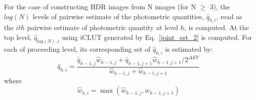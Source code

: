 For the case of constructing HDR images from N images (for N $\ge$ 3), the $log(N)$ levels of 
pairwise estimate of the photometric quantities, $\hat{q}_{h,i}$, read as the $ith$ pairwise estimate of 
photometric quantity at level $h$, is computed. At the top level, $\hat{q}_{log(N),i}$ using iCLUT 
generated by Eq.~\ref{joint_est_2} is computed. For each of proceeding level, its corresponding set of $
\hat{q}_{h,i}$ is estimated by: 
\begin{equation}
\hat{q}_{h,i}=\frac{\hat{q}_{h-1,j}\hat{w}_{h-1,j}+\hat{q}_{h-1,j+1}\hat{w}_{h-1,j+1}/ 2^{\Delta EV}}
{\hat{w}_{h-1,j}+\hat{w}_{h-1,j+1}}
\end{equation}
where
\begin{equation}
\hat{w}_{h,i}=\max(\hat{w}_{h-1,j},\hat{w}_{h-1,j+1})
\end{equation}






